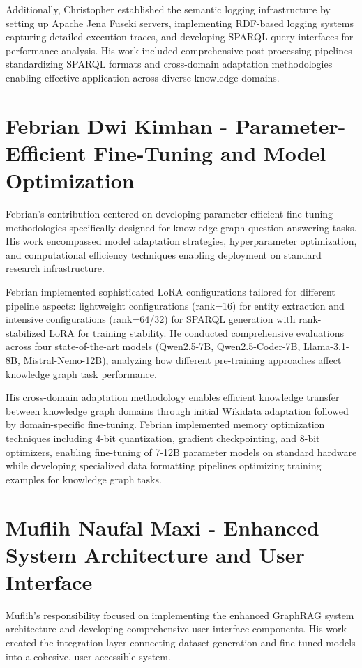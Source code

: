 Additionally, Christopher established the semantic logging infrastructure by setting up Apache Jena Fuseki servers, implementing RDF-based logging systems capturing detailed execution traces, and developing SPARQL query interfaces for performance analysis. His work included comprehensive post-processing pipelines standardizing SPARQL formats and cross-domain adaptation methodologies enabling effective application across diverse knowledge domains.

\section*{Febrian Dwi Kimhan - Parameter-Efficient Fine-Tuning and Model Optimization}

Febrian's contribution centered on developing parameter-efficient fine-tuning methodologies specifically designed for knowledge graph question-answering tasks. His work encompassed model adaptation strategies, hyperparameter optimization, and computational efficiency techniques enabling deployment on standard research infrastructure.

Febrian implemented sophisticated LoRA configurations tailored for different pipeline aspects: lightweight configurations (rank=16) for entity extraction and intensive configurations (rank=64/32) for SPARQL generation with rank-stabilized LoRA for training stability. He conducted comprehensive evaluations across four state-of-the-art models (Qwen2.5-7B, Qwen2.5-Coder-7B, Llama-3.1-8B, Mistral-Nemo-12B), analyzing how different pre-training approaches affect knowledge graph task performance.

His cross-domain adaptation methodology enables efficient knowledge transfer between knowledge graph domains through initial Wikidata adaptation followed by domain-specific fine-tuning. Febrian implemented memory optimization techniques including 4-bit quantization, gradient checkpointing, and 8-bit optimizers, enabling fine-tuning of 7-12B parameter models on standard hardware while developing specialized data formatting pipelines optimizing training examples for knowledge graph tasks.

\section*{Muflih Naufal Maxi - Enhanced System Architecture and User Interface}

Muflih's responsibility focused on implementing the enhanced GraphRAG system architecture and developing comprehensive user interface components. His work created the integration layer connecting dataset generation and fine-tuned models into a cohesive, user-accessible system.


